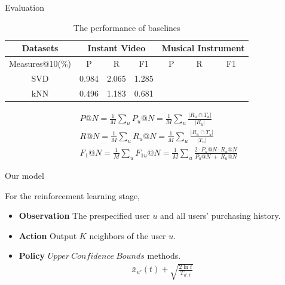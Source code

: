 \documentclass{beamer}
\begin{document}
\begin{frame}{Evaluation}


\begin{table}[htbp]
  \centering
  
    \begin{tabular}{c|ccc|ccc}
    \hline
    Datasets & \multicolumn{3}{c|}{Instant Video} & \multicolumn{3}{c}{Musical Instrument} \\
    \hline
    \hline
    Measures@10(\%) & P     & R     & F1    & P     & R     & F1 \\
    \hline
    SVD   & 0.984 & 2.065 & 1.285 &       &       &  \\
    kNN   & 0.496 & 1.183 & 0.681 &       &       &  \\
    \hline
    \hline
    \end{tabular}%
  \label{tab:addlabel}%
  \caption{The performance of baselines}
\end{table}%

\begin{align*}
&P@N = \frac{1}{M} \sum_u P_u@N = \frac{1}{M} \sum_u \frac{|R_u \cap T_u|}{|R_u|}\\
&R@N = \frac{1}{M} \sum_u R_u@N = \frac{1}{M} \sum_u \frac{|R_u \cap T_u|}{|T_u|}\\
&F_1@N = \frac{1}{M} \sum_u F_{1u}@N = \frac{1}{M} \sum_u \frac{2 \cdot P_u@N \cdot R_u@N }{P_u@N\ +\ R_u@N}
\end{align*} 


\end{frame}











\begin{frame}{Our model}


For the reinforcement learning stage,
\begin{itemize}
    \item \textbf{Observation} The prespecified user $u$ and all users' purchasing history. 
    \item \textbf{Action} Output $K$ neighbors of the user $u$.
    \item \textbf{Policy} $Upper\ Confidence\ Bounds$ methods.
    \begin{align*}
        \bar{x}_{u'}(t) + \sqrt{\frac{2 \ln{t}}{T_{u',t}}}
    \end{align*}
\end{itemize}


\end{frame}
\end{document}
